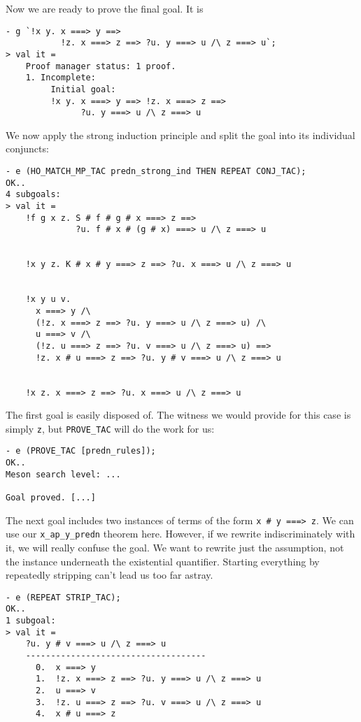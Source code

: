 \documentclass[12pt]{article}
\begin{document}
Now we are ready to prove the final goal.  It is
\begin{session}\begin{verbatim}
- g `!x y. x ===> y ==>
           !z. x ===> z ==> ?u. y ===> u /\ z ===> u`;
> val it =
    Proof manager status: 1 proof.
    1. Incomplete:
         Initial goal:
         !x y. x ===> y ==> !z. x ===> z ==>
               ?u. y ===> u /\ z ===> u
\end{verbatim}\end{session}
We now apply the strong induction principle and split the goal into
its individual conjuncts:
\begin{session}\begin{verbatim}
- e (HO_MATCH_MP_TAC predn_strong_ind THEN REPEAT CONJ_TAC);
OK..
4 subgoals:
> val it =
    !f g x z. S # f # g # x ===> z ==>
              ?u. f # x # (g # x) ===> u /\ z ===> u


    !x y z. K # x # y ===> z ==> ?u. x ===> u /\ z ===> u


    !x y u v.
      x ===> y /\
      (!z. x ===> z ==> ?u. y ===> u /\ z ===> u) /\
      u ===> v /\
      (!z. u ===> z ==> ?u. v ===> u /\ z ===> u) ==>
      !z. x # u ===> z ==> ?u. y # v ===> u /\ z ===> u


    !x z. x ===> z ==> ?u. x ===> u /\ z ===> u
\end{verbatim}\end{session}
The first goal is easily disposed of.  The witness we would provide
for this case is simply \texttt{z}, but \texttt{PROVE\_TAC} will do
the work for us:
\begin{session}\begin{verbatim}
- e (PROVE_TAC [predn_rules]);
OK..
Meson search level: ...

Goal proved. [...]
\end{verbatim}\end{session}
    The next goal includes two instances of terms of the form
    \verb!x # y ===> z!.  We can use our \verb!x_ap_y_predn!
    theorem here.  However, if we rewrite indiscriminately with it, we
    will really confuse the goal.  We want to rewrite just the
    assumption, not the instance underneath the existential
    quantifier.  Starting everything by repeatedly stripping can't
    lead us too far astray.
\begin{session}\begin{verbatim}
- e (REPEAT STRIP_TAC);
OK..
1 subgoal:
> val it =
    ?u. y # v ===> u /\ z ===> u
    ------------------------------------
      0.  x ===> y
      1.  !z. x ===> z ==> ?u. y ===> u /\ z ===> u
      2.  u ===> v
      3.  !z. u ===> z ==> ?u. v ===> u /\ z ===> u
      4.  x # u ===> z
\end{verbatim}\end{session}
\end{document}
